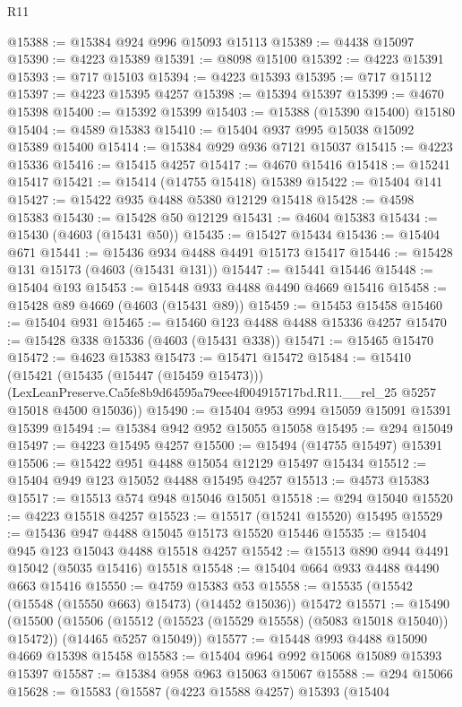 \begin{lexlean}{R11}
\begin{coremodule}
@15388 := @15384 @924 @996 @15093 @15113
@15389 := @4438 @15097
@15390 := @4223 @15389
@15391 := @8098 @15100
@15392 := @4223 @15391
@15393 := @717 @15103
@15394 := @4223 @15393
@15395 := @717 @15112
@15397 := @4223 @15395 @4257
@15398 := @15394 @15397
@15399 := @4670 @15398
@15400 := @15392 @15399
@15403 := @15388 (@15390 @15400) @15180
@15404 := @4589 @15383
@15410 := @15404 @937 @995 @15038 @15092 @15389 @15400
@15414 := @15384 @929 @936 @7121 @15037
@15415 := @4223 @15336
@15416 := @15415 @4257
@15417 := @4670 @15416
@15418 := @15241 @15417
@15421 := @15414 (@14755 @15418) @15389
@15422 := @15404 @141
@15427 := @15422 @935 @4488 @5380 @12129 @15418
@15428 := @4598 @15383
@15430 := @15428 @50 @12129
@15431 := @4604 @15383
@15434 := @15430 (@4603 (@15431 @50))
@15435 := @15427 @15434
@15436 := @15404 @671
@15441 := @15436 @934 @4488 @4491 @15173 @15417
@15446 := @15428 @131 @15173 (@4603 (@15431 @131))
@15447 := @15441 @15446
@15448 := @15404 @193
@15453 := @15448 @933 @4488 @4490 @4669 @15416
@15458 := @15428 @89 @4669 (@4603 (@15431 @89))
@15459 := @15453 @15458
@15460 := @15404 @931
@15465 := @15460 @123 @4488 @4488 @15336 @4257
@15470 := @15428 @338 @15336 (@4603 (@15431 @338))
@15471 := @15465 @15470
@15472 := @4623 @15383
@15473 := @15471 @15472
@15484 := @15410
    (@15421
      (@15435 (@15447 (@15459 @15473)))
      (LexLeanPreserve.Ca5fe8b9d64595a79eee4f004915717bd.R11.__rel_25 @5257 @15018 @4500 @15036))
@15490 := @15404 @953 @994 @15059 @15091 @15391 @15399
@15494 := @15384 @942 @952 @15055 @15058
@15495 := @294 @15049
@15497 := @4223 @15495 @4257
@15500 := @15494 (@14755 @15497) @15391
@15506 := @15422 @951 @4488 @15054 @12129 @15497 @15434
@15512 := @15404 @949 @123 @15052 @4488 @15495 @4257
@15513 := @4573 @15383
@15517 := @15513 @574 @948 @15046 @15051
@15518 := @294 @15040
@15520 := @4223 @15518 @4257
@15523 := @15517 (@15241 @15520) @15495
@15529 := @15436 @947 @4488 @15045 @15173 @15520 @15446
@15535 := @15404 @945 @123 @15043 @4488 @15518 @4257
@15542 := @15513 @890 @944 @4491 @15042 (@5035 @15416) @15518
@15548 := @15404 @664 @933 @4488 @4490 @663 @15416
@15550 := @4759 @15383 @53
@15558 := @15535 (@15542 (@15548 (@15550 @663) @15473) (@14452 @15036)) @15472
@15571 := @15490
    (@15500
      (@15506 (@15512 (@15523 (@15529 @15558) (@5083 @15018 @15040)) @15472))
      (@14465 @5257 @15049))
@15577 := @15448 @993 @4488 @15090 @4669 @15398 @15458
@15583 := @15404 @964 @992 @15068 @15089 @15393 @15397
@15587 := @15384 @958 @963 @15063 @15067
@15588 := @294 @15066
@15628 := @15583
    (@15587
      (@4223 @15588 @4257)
      @15393
      (@15404

\end{coremodule}
\end{lexlean}
